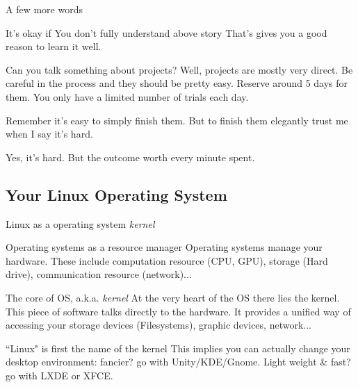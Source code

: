 \begin{frame}{A few more words}
\begin{block}{It's okay if You don't fully understand above story}
	That's gives you a good reason to learn it well.
\end{block}
\begin{block}{Can you talk something about projects?}
	Well, projects are mostly very direct. Be careful in the process and they should be pretty easy. Reserve around 5 days for them. You only have a limited number of trials each day. 
	
	Remember it's easy to simply finish them. But to finish them elegantly trust me when I say it's hard. 
	
	Yes, it's hard. But the outcome worth every minute spent.
\end{block}
\end{frame}

\subsection{Your Linux Operating System}
\begin{frame}{Linux as a operating system \textit{kernel}}
\begin{block}{Operating systems as a resource manager}
	Operating systems manage your hardware. These include computation resource (CPU, GPU), storage (Hard drive), communication resource (network)...
\end{block}
\begin{block}{The core of OS, a.k.a. \textit{kernel}}
	At the very heart of the OS there lies the kernel. This piece of software talks directly to the hardware. It provides a unified way of accessing your storage devices (Filesystems), graphic devices, network...
\end{block}
\begin{block}{``Linux" is first the name of the kernel}
	This implies you can actually change your desktop environment: fancier? go with Unity/KDE/Gnome. Light weight \& fast? go with LXDE or XFCE. 
\end{block}
\end{frame}

